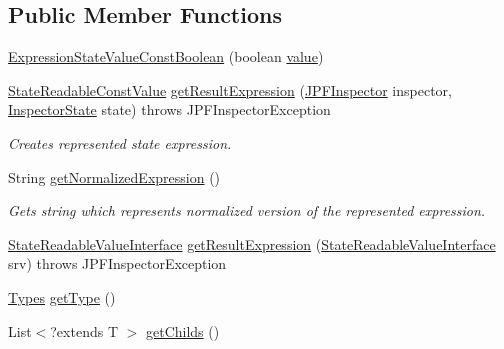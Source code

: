 \subsection*{Public Member Functions}
\begin{DoxyCompactItemize}
\item 
\hyperlink{classgov_1_1nasa_1_1jpf_1_1inspector_1_1server_1_1expression_1_1expressions_1_1_expression_state_value_const_boolean_a2f24abdedfccecbe5cea7a320051512e}{Expression\+State\+Value\+Const\+Boolean} (boolean \hyperlink{classgov_1_1nasa_1_1jpf_1_1inspector_1_1server_1_1expression_1_1expressions_1_1_expression_state_value_const_boolean_ade9702d2cd4df8d8a3f6ace0b0475fba}{value})
\item 
\hyperlink{classgov_1_1nasa_1_1jpf_1_1inspector_1_1server_1_1programstate_1_1_state_readable_const_value}{State\+Readable\+Const\+Value} \hyperlink{classgov_1_1nasa_1_1jpf_1_1inspector_1_1server_1_1expression_1_1expressions_1_1_expression_state_value_const_boolean_add7e3fb06fbe9c355e23bf3a3195bb63}{get\+Result\+Expression} (\hyperlink{classgov_1_1nasa_1_1jpf_1_1inspector_1_1server_1_1jpf_1_1_j_p_f_inspector}{J\+P\+F\+Inspector} inspector, \hyperlink{interfacegov_1_1nasa_1_1jpf_1_1inspector_1_1server_1_1expression_1_1_inspector_state}{Inspector\+State} state)  throws J\+P\+F\+Inspector\+Exception 
\begin{DoxyCompactList}\small\item\em Creates represented state expression. \end{DoxyCompactList}\item 
String \hyperlink{classgov_1_1nasa_1_1jpf_1_1inspector_1_1server_1_1expression_1_1expressions_1_1_expression_state_value_const_boolean_a1ddaedcf0fb85b579d3764d2154ea945}{get\+Normalized\+Expression} ()
\begin{DoxyCompactList}\small\item\em Gets string which represents normalized version of the represented expression. \end{DoxyCompactList}\item 
\hyperlink{interfacegov_1_1nasa_1_1jpf_1_1inspector_1_1server_1_1programstate_1_1_state_readable_value_interface}{State\+Readable\+Value\+Interface} \hyperlink{classgov_1_1nasa_1_1jpf_1_1inspector_1_1server_1_1expression_1_1expressions_1_1_expression_state_value_const_a11bde76b1048dc08cc72bb596c357c7c}{get\+Result\+Expression} (\hyperlink{interfacegov_1_1nasa_1_1jpf_1_1inspector_1_1server_1_1programstate_1_1_state_readable_value_interface}{State\+Readable\+Value\+Interface} srv)  throws J\+P\+F\+Inspector\+Exception 
\item 
\hyperlink{enumgov_1_1nasa_1_1jpf_1_1inspector_1_1server_1_1expression_1_1_types}{Types} \hyperlink{classgov_1_1nasa_1_1jpf_1_1inspector_1_1server_1_1expression_1_1expressions_1_1_expression_state_value_a9317f49f60c166a2f46f90702e75f22e}{get\+Type} ()
\item 
List$<$?extends T $>$ \hyperlink{classgov_1_1nasa_1_1jpf_1_1inspector_1_1server_1_1expression_1_1_expression_state_unary_operator_ad010bcb9c4e2eb584321b5ceba8e1682}{get\+Childs} ()
\end{DoxyCompactItemize}

